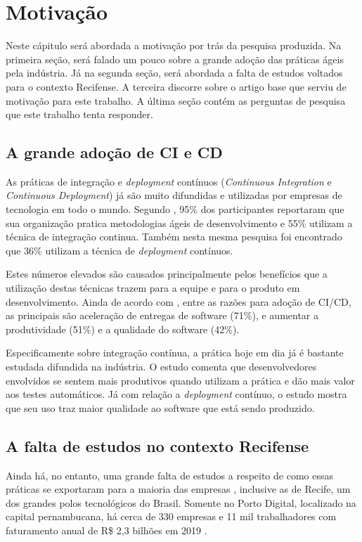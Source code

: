 
\chapter{Motivação}
Neste cápitulo será abordada a motivação por trás da pesquisa produzida. Na primeira seção, será falado um pouco sobre a grande adoção das práticas ágeis pela indústria. Já na segunda seção, será abordada a falta de estudos voltados para o contexto Recifense. A terceira discorre sobre o artigo base que serviu de motivação para este trabalho. A última seção contém as perguntas de pesquisa que este trabalho tenta responder.

\section{A grande adoção de CI e CD}
As práticas de integração e \emph{deployment} contínuos (\emph{Continuous Integration} e \emph{Continuous Deployment}) já são muito difundidas e utilizadas por empresas de tecnologia em todo o mundo. Segundo \cite{stateAgileReport2020}, 95\% dos participantes reportaram que sua organização pratica metodologias ágeis de desenvolvimento e 55\% utilizam a técnica de integração continua. Também nesta mesma pesquisa foi encontrado que 36\% utilizam a técnica de \emph{deployment} contínuos. 

Estes números elevados são causados principalmente pelos benefícios que a utilização destas técnicas trazem para a equipe e para o produto em desenvolvimento. Ainda de acordo com \cite{stateAgileReport2020}, entre as razões para adoção de CI/CD, as principais são aceleração de entregas de software (71\%), e aumentar a produtividade (51\%) e a qualidade do software (42\%). 

Especificamente sobre integração contínua, a prática hoje em dia já é bastante estudada difundida na indústria. O estudo \cite{hilton2016} comenta que desenvolvedores envolvidos se sentem mais produtivos quando utilizam a prática e dão mais valor aos testes automáticos.  Já com relação a \emph{deployment} contínuo, o estudo \cite{savor2015} mostra que seu uso traz maior qualidade ao software que está sendo produzido. 

\section{A falta de estudos no contexto Recifense}

Ainda há, no entanto, uma grande falta de estudos a respeito de como essas práticas se exportaram para a maioria das empresas \cite{empiricalStudy2016}, inclusive as de Recife, um dos grandes polos tecnológicos do Brasil. Somente no Porto Digital, localizado na capital pernambucana, há cerca de 330 empresas e 11 mil trabalhadores com faturamento anual de R\$ 2,3 bilhões em 2019 \cite{portoDigital}.

